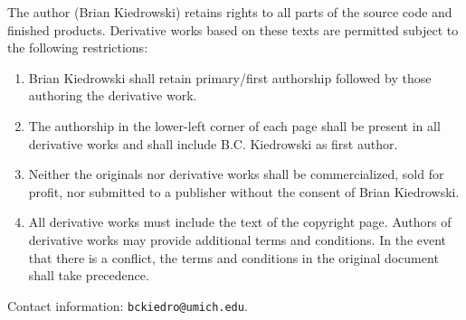 \noindent The author (Brian Kiedrowski) retains rights to all parts of the source code and finished products. Derivative works based on these texts are permitted subject to the following restrictions:
\begin{enumerate}
  \item Brian Kiedrowski shall retain primary/first authorship followed by those authoring the derivative work.
  \item The authorship in the lower-left corner of each page shall be present in all derivative works and shall include B.C. Kiedrowski as first author.
  \item Neither the originals nor derivative works shall be commercialized, sold for profit, nor submitted to a publisher without the consent of Brian Kiedrowski.
  \item All derivative works must include the text of the copyright page. Authors of derivative works may provide additional terms and conditions. In the event that there is a conflict, the terms and conditions in the original document shall take precedence.
\end{enumerate}

\noindent Contact information: \texttt{bckiedro@umich.edu}.
\normalsize
\newpage

%
%
%


